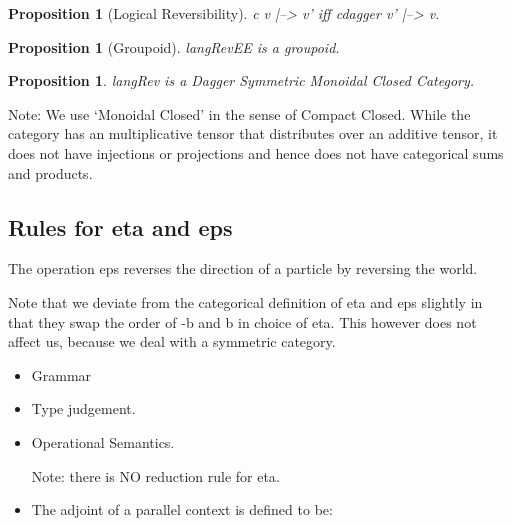 \documentclass[preprint]{sigplanconf}
\newtheorem{proposition}[theorem]{Proposition}
\begin{document}
\begin{proposition}[Logical Reversibility]
\label{prop:logrev}
{{c v |--> v'}} iff {{c{dagger} v' |--> v}}.
\end{proposition}

\begin{proposition}[Groupoid]
\label{prop:groupoid}
{{langRevEE}} is a groupoid. 
\end{proposition}

\begin{proposition}
\label{prop:groupoid}
{{langRev}} is a Dagger Symmetric Monoidal Closed Category.
\end{proposition}

Note: We use `Monoidal Closed' in the sense of Compact Closed. While
the category has an multiplicative tensor that distributes over an
additive tensor, it does not have injections or projections and hence
does not have categorical sums and products.

\subsection{Rules for {{eta}} and {{eps}} }

The operation {{eps}} reverses the direction of a particle by
reversing the world. 

Note that we deviate from the categorical definition of {{eta}} and
{{eps}} slightly in that they swap the order of {{-b}} and {{b}} in
choice of {{eta}}. This however does not affect us, because we deal
with a symmetric category.

\begin{itemize}
\item Grammar

\item
Type judgement.


\item
Operational Semantics.

Note: there is NO reduction rule for {{eta}}. 

\item
The adjoint of a parallel context is defined to be:

\end{itemize}
\end{document}
